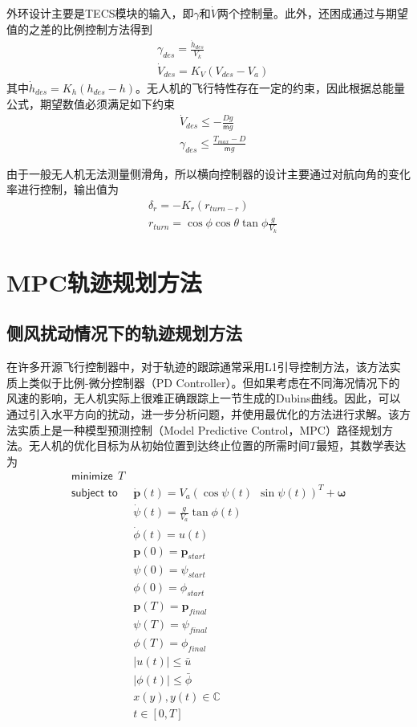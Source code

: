 外环设计主要是TECS模块的输入，即$\gamma$和$\dot{V}$两个控制量。此外，还困成通过与期望值的之差的比例控制方法得到
\begin{align}
&\gamma_{des} = \frac{\dot{h}_{des}}{V_k} \\
&\dot{V}_{des} = K_V(V_{des}-V_a) 
\end{align}
其中$\dot{h}_{des} = K_h(h_{des}-h)$。无人机的飞行特性存在一定的约束，因此根据总能量公式，期望数值必须满足如下约束
\begin{align}
&\dot{V} _{des} \le -\frac{Dg}{\mathsf{m}g} \\
&\gamma_{des} \le \frac{T_{max} - D}{\mathsf{m}g}
\end{align}

由于一般无人机无法测量侧滑角，所以横向控制器的设计主要通过对航向角的变化率进行控制，输出值为
\begin{align}
&\delta_r = -K_r (r_{turn - r}) \\
&r_{turn} = \cos \phi \cos \theta \tan \phi \frac{g}{V_k}
\end{align}

\section{MPC轨迹规划方法}

\subsection{侧风扰动情况下的轨迹规划方法}
在许多开源飞行控制器中，对于轨迹的跟踪通常采用L1引导控制方法，该方法实质上类似于比例-微分控制器（PD Controller）。但如果考虑在不同海况情况下的风速的影响，无人机实际上很难正确跟踪上一节生成的Dubins曲线。因此，可以通过引入水平方向的扰动，进一步分析问题，并使用最优化的方法进行求解。该方法实质上是一种模型预测控制（Model Predictive Control，MPC）路径规划方法。无人机的优化目标为从初始位置到达终止位置的所需时间$T$最短，其数学表达为 
\begin{align}
\textsf{minimize}\ \ T \label{eq:gust_dubins_1} \\
\textsf{subject to}\  \ &\dot{\mathbf{p}}(t) = {V}_a(\cos \psi(t)\ \ \sin \psi(t))^T + \mathbf{\omega}  \nonumber \\
& \dot{\psi}(t) = \frac{g}{{V}_a} \tan \phi(t) \nonumber \\
& \dot{\phi}(t) = u(t) \nonumber \\
& \mathbf{p}(0) = \mathbf{p}_{start} \nonumber \\
& \psi(0) = \psi_{start} \nonumber \\
& \phi(0) = \phi_{start} \nonumber \\
& \mathbf{p}(T) = \mathbf{p}_{final} \nonumber \\
& \psi(T) = \psi_{final} \nonumber \\
& \phi(T) = \phi_{final} \nonumber \\
& |u(t)| \le \bar{u}  \nonumber \\
& |\phi(t)| \le \bar{\phi} \nonumber \\
& x(y), y(t) \in \mathbb{C} \nonumber \\
& t \in [0, T] \nonumber
\end{align}

